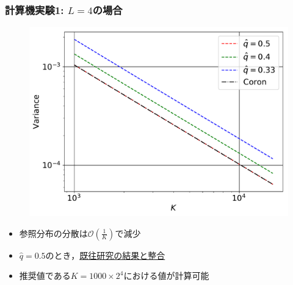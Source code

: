 \documentclass[dvipdfmx,11pt]{beamer}
\begin{document}
\begin{frame}[c]\frametitle{計算機実験1: $L=4$の場合}
\centering
\begin{figure}
\includegraphics[width=.7\linewidth]{./figure/comparison_coron_L4_1000.pdf}
\end{figure}
%
\begin{itemize}\setlength{\itemsep}{0.5\baselineskip}
  \item 参照分布の分散は$\mathcal{O}(\frac{1}{K})$で減少
  \item $\hat{q}=0.5$のとき，\underline{既往研究の結果と整合}
  \item 推奨値である$K=1000\times 2^4$における値が計算可能
\end{itemize}
%
\end{frame}
\end{document}
